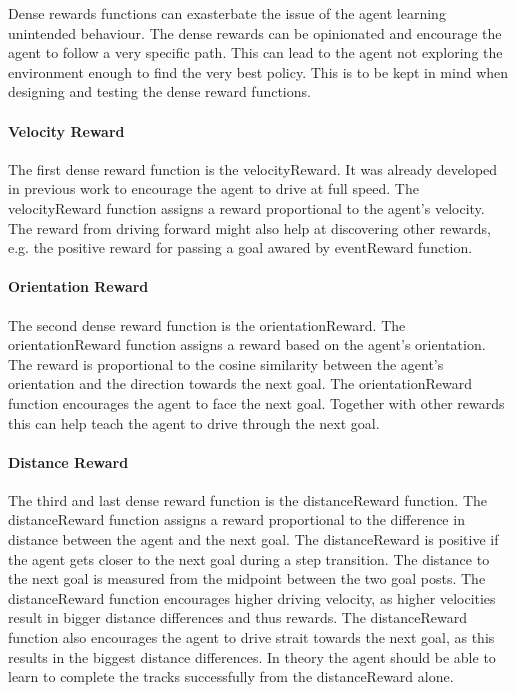 Dense rewards functions can exasterbate the issue of the agent learning unintended behaviour. The dense rewards can be opinionated and encourage the agent to follow a very specific path. This can lead to the agent not exploring the environment enough to find the very best policy. This is to be kept in mind when designing and testing the dense reward functions.


\paragraph{Velocity Reward}
The first dense reward function is the velocityReward. It was already developed in previous work \autocite{maximilian} to encourage the agent to drive at full speed. The velocityReward function assigns a reward proportional to the agent's velocity. The reward from driving forward might also help at discovering other rewards, e.g. the positive reward for passing a goal awared by eventReward function.

\paragraph{Orientation Reward}
The second dense reward function is the orientationReward. The orientationReward function assigns a reward based on the agent's orientation. The reward is proportional to the cosine similarity between the agent's orientation and the direction towards the next goal. The orientationReward function encourages the agent to face the next goal. Together with other rewards this can help teach the agent to drive through the next goal.

\paragraph{Distance Reward}
The third and last dense reward function is the distanceReward function. The distanceReward function assigns a reward proportional to the difference in distance between the agent and the next goal. The distanceReward is positive if the agent gets closer to the next goal during a step transition. The distance to the next goal is measured from the midpoint between the two goal posts. The distanceReward function encourages higher driving velocity, as higher velocities result in bigger distance differences and thus rewards. The distanceReward function also encourages the agent to drive strait towards the next goal, as this results in the biggest distance differences. In theory the agent should be able to learn to complete the tracks successfully from the distanceReward alone.

